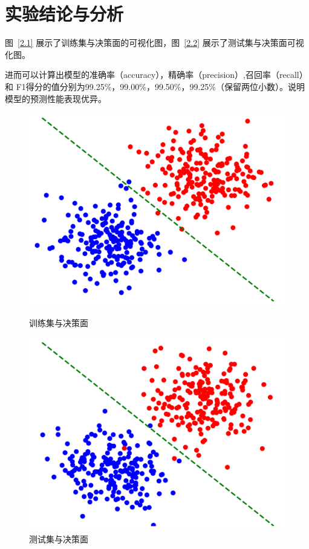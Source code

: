 \documentclass[a4paper,12pt]{report}
\begin{document}
\section{实验结论与分析}
\par 图~\ref{2.1} 展示了训练集与决策面的可视化图，图~\ref{2.2} 展示了测试集与决策面可视化图。
\par 进而可以计算出模型的准确率（accuracy），精确率（precision）,召回率（recall）和 F1得分的值分别为99.25\%，99.00\%，99.50\%，99.25\%（保留两位小数）。说明模型的预测性能表现优异。
\begin{figure}[htbp]
    \centering
    \begin{minipage}{0.42\textwidth}
        \centering
        \includegraphics[width=\textwidth]{../datasets/exp2/output/train.png}
        \caption{训练集与决策面}
        \label{2.1}
    \end{minipage}
    \hfill
    \begin{minipage}{0.42\textwidth}
        \centering
        \includegraphics[width=\textwidth]{../datasets/exp2/output/test.png}
        \caption{测试集与决策面}
        \label{2.2}
    \end{minipage}
    \label{fig:train_test_comparison}
\end{figure}
\end{document}

